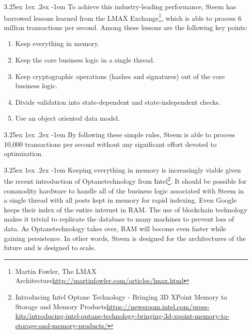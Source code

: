 \documentclass{article}
\makeatletter
\renewcommand\paragraph{\@startsection{paragraph}{5}{\z@}%
  {3.25ex \@plus1ex \@minus.2ex}%
  {-1em}%
  {\normalfont\normalsize\bfseries}}
\makeatother
\begin{document}
			\paragraph{}
				To achieve this industry-leading performance, Steem has borrowed lessons learned from the LMAX Exchange\footnote{Martin Fowler, The LMAX Architecture\newline\url{http://martinfowler.com/articles/lmax.html}}, which is able to process 6 million transactions per second. Among these lessons are the following key points:

			\begin{enumerate}
				\item Keep everything in memory.
				\item Keep the core business logic in a single thread.
				\item Keep cryptographic operations (hashes and signatures) out of the core business logic.
				\item Divide validation into state-dependent and state-independent checks.
				\item Use an object oriented data model.
			\end{enumerate}

			\paragraph{}
				By following these simple rules, Steem is able to process 10,000 transactions per second without any significant effort devoted to optimization.

			\paragraph{}
				Keeping everything in memory is increasingly viable given the recent introduction of Optane\texttrademark technology from Intel\footnote{Introducing Intel Optane Technology - Bringing 3D XPoint Memory to Storage and Memory Products\newline\url{https://newsroom.intel.com/press-kits/introducing-intel-optane-technology-bringing-3d-xpoint-memory-to-storage-and-memory-products/}}. It should be possible for commodity hardware to handle all of the business logic associated with Steem in a single thread with all posts kept in memory for rapid indexing. Even Google keeps their index of the entire internet in RAM. The use of blockchain technology makes it trivial to replicate the database to many machines to prevent loss of data. As Optane\texttrademark technology takes over, RAM will become even faster while gaining persistence. In other words, Steem is designed for the architectures of the future and is designed to scale.
\end{document}
